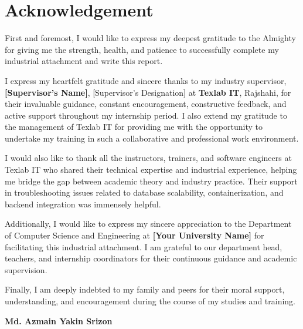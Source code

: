 \chapter*{Acknowledgement}

First and foremost, I would like to express my deepest gratitude to the Almighty for giving me the strength, health, and patience to successfully complete my industrial attachment and write this report.

I express my heartfelt gratitude and sincere thanks to my industry supervisor, \textbf{[Supervisor's Name]}, [Supervisor's Designation] at \textbf{Texlab IT}, Rajshahi, for their invaluable guidance, constant encouragement, constructive feedback, and active support throughout my internship period. I also extend my gratitude to the management of Texlab IT for providing me with the opportunity to undertake my training in such a collaborative and professional work environment.

I would also like to thank all the instructors, trainers, and software engineers at Texlab IT who shared their technical expertise and industrial experience, helping me bridge the gap between academic theory and industry practice. Their support in troubleshooting issues related to database scalability, containerization, and backend integration was immensely helpful.

Additionally, I would like to express my sincere appreciation to the Department of Computer Science and Engineering at \textbf{[Your University Name]} for facilitating this industrial attachment. I am grateful to our department head, teachers, and internship coordinators for their continuous guidance and academic supervision.

Finally, I am deeply indebted to my family and peers for their moral support, understanding, and encouragement during the course of my studies and training.

\vspace{1.5cm}

\noindent
\textbf{Md. Azmain Yakin Srizon}

